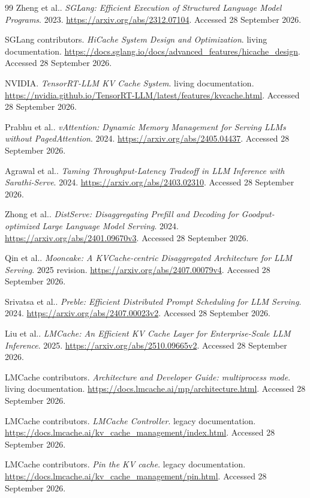 \begin{thebibliography}{99}
 Zheng et al.. \emph{SGLang: Efficient Execution of Structured Language Model Programs}. 2023. \url{https://arxiv.org/abs/2312.07104}. Accessed 28 September 2026.

 SGLang contributors. \emph{HiCache System Design and Optimization}. living documentation. \url{https://docs.sglang.io/docs/advanced_features/hicache_design}. Accessed 28 September 2026.

 NVIDIA. \emph{TensorRT-LLM KV Cache System}. living documentation. \url{https://nvidia.github.io/TensorRT-LLM/latest/features/kvcache.html}. Accessed 28 September 2026.

 Prabhu et al.. \emph{vAttention: Dynamic Memory Management for Serving LLMs without PagedAttention}. 2024. \url{https://arxiv.org/abs/2405.04437}. Accessed 28 September 2026.

 Agrawal et al.. \emph{Taming Throughput-Latency Tradeoff in LLM Inference with Sarathi-Serve}. 2024. \url{https://arxiv.org/abs/2403.02310}. Accessed 28 September 2026.

 Zhong et al.. \emph{DistServe: Disaggregating Prefill and Decoding for Goodput-optimized Large Language Model Serving}. 2024. \url{https://arxiv.org/abs/2401.09670v3}. Accessed 28 September 2026.

 Qin et al.. \emph{Mooncake: A KVCache-centric Disaggregated Architecture for LLM Serving}. 2025 revision. \url{https://arxiv.org/abs/2407.00079v4}. Accessed 28 September 2026.

 Srivatsa et al.. \emph{Preble: Efficient Distributed Prompt Scheduling for LLM Serving}. 2024. \url{https://arxiv.org/abs/2407.00023v2}. Accessed 28 September 2026.

 Liu et al.. \emph{LMCache: An Efficient KV Cache Layer for Enterprise-Scale LLM Inference}. 2025. \url{https://arxiv.org/abs/2510.09665v2}. Accessed 28 September 2026.

 LMCache contributors. \emph{Architecture and Developer Guide: multiprocess mode}. living documentation. \url{https://docs.lmcache.ai/mp/architecture.html}. Accessed 28 September 2026.

 LMCache contributors. \emph{LMCache Controller}. legacy documentation. \url{https://docs.lmcache.ai/kv_cache_management/index.html}. Accessed 28 September 2026.

 LMCache contributors. \emph{Pin the KV cache}. legacy documentation. \url{https://docs.lmcache.ai/kv_cache_management/pin.html}. Accessed 28 September 2026.


\end{thebibliography}

